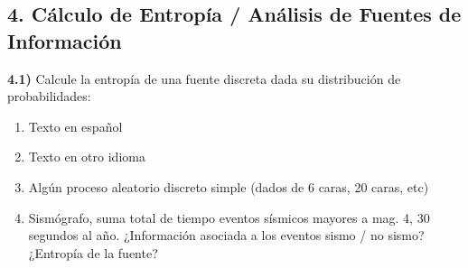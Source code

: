 \subsection*{4. Cálculo de Entropía / Análisis de Fuentes de Información}

\textbf{4.1)} Calcule la entropía de una fuente discreta dada su distribución de probabilidades:
\begin{enumerate}[label=\alph*)]
    \item Texto en español
    \item Texto en otro idioma
    \item Algún proceso aleatorio discreto simple (dados de 6 caras, 20 caras, etc)
    \item Sismógrafo, suma total de tiempo eventos sísmicos mayores a mag. 4, 30 segundos al año. ¿Información asociada a los eventos sismo / no sismo? ¿Entropía de la fuente?
\end{enumerate}